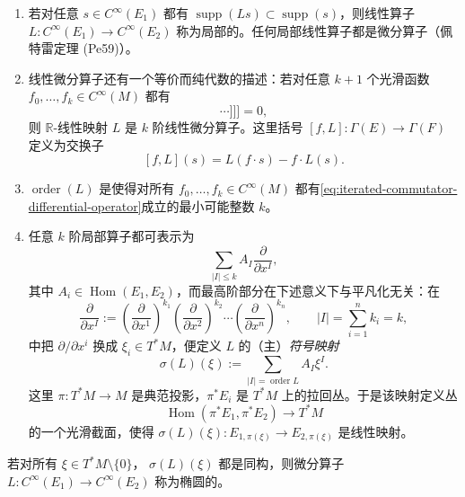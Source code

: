 \begin{enumerate}[label=(\arabic*)]
 \item 若对任意 $s\in C^\infty(E_1)$ 都有
 $\operatorname{supp}(Ls)\subset\operatorname{supp}(s)$，则线性算子
 $L:C^\infty(E_1)\to C^\infty(E_2)$ 称为局部的。任何局部线性算子都是微分算子（佩特雷定理 (Pe59)）。

 \item 线性微分算子还有一个等价而纯代数的描述：若对任意
 $k+1$ 个光滑函数 $f_0,\ldots,f_k\in C^\infty(M)$ 都有
 \begin{equation}
  [f_k,[f_{k-1},[\cdots[f_0,P]\cdots]]]=0,
  \label{eq:iterated-commutator-differential-operator}
 \end{equation}
 则 $\mathbb R$-线性映射 $L$ 是 $k$ 阶线性微分算子。这里括号
 $[f,L]:\Gamma(E)\to\Gamma(F)$ 定义为交换子
 \[
  [f,L](s)=L(f\cdot s)-f\cdot L(s).
 \]

 \item $\operatorname{order}(L)$ 是使得对所有
 $f_0,\ldots,f_k\in C^\infty(M)$ 都有\eqref{eq:iterated-commutator-differential-operator}成立的最小可能整数 $k$。

 \item 任意 $k$ 阶局部算子都可表示为
 \[
  \sum_{|I|\leq k}A_I\frac{\partial}{\partial x^I},
 \]
 其中 $A_i\in\operatorname{Hom}(E_1,E_2)$，而最高阶部分在下述意义下与平凡化无关：在
 \[
  \frac{\partial}{\partial x^I}:=
  \left(\frac{\partial}{\partial x^1}\right)^{k_1}
  \left(\frac{\partial}{\partial x^2}\right)^{k_2}
  \cdots
  \left(\frac{\partial}{\partial x^n}\right)^{k_n},
  \qquad |I|=\sum_{i=1}^n k_i=k,
 \]
 中把 $\partial/\partial x^i$ 换成 $\xi_i\in T^*M$，便定义 $L$ 的（主）\emph{符号映射}
 \begin{equation}
  \sigma(L)(\xi):=
  \sum_{|I|=\operatorname{order}L}A_I\xi^I.
  \label{eq:principal-symbol-map}
 \end{equation}
 这里 $\pi:T^*M\to M$ 是典范投影，$\pi^*E_i$ 是 $T^*M$ 上的拉回丛。于是该映射定义丛
 \[
  \operatorname{Hom}(\pi^*E_1,\pi^*E_2)\longrightarrow T^*M
 \]
 的一个光滑截面，使得
 $\sigma(L)(\xi):E_{1,\pi(\xi)}\to E_{2,\pi(\xi)}$ 是线性映射。
\end{enumerate}

\begin{definition}\label{def:elliptic-differential-operator}
若对所有 $\xi\in T^*M\setminus\{0\}$，
$\sigma(L)(\xi)$ 都是同构，则微分算子
$L:C^\infty(E_1)\to C^\infty(E_2)$ 称为椭圆的。
\end{definition}


